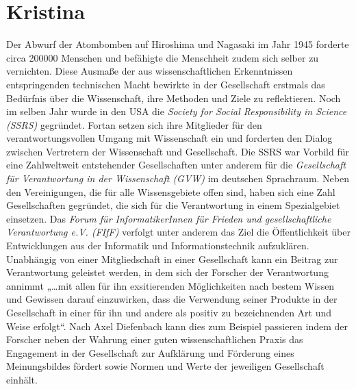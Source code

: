 \documentclass{pmwk}
\begin{document}
\section*{Kristina}
Der Abwurf der Atombomben auf Hiroshima und Nagasaki im Jahr 1945 forderte circa 200000 Menschen und befähigte die Menschheit zudem sich selber zu vernichten. Diese Ausmaße der aus wissenschaftlichen Erkenntnissen entspringenden technischen Macht bewirkte in der Gesellschaft erstmals das Bedürfnis über die Wissenschaft, ihre Methoden und Ziele zu reflektieren. Noch im selben Jahr wurde in den USA die \textit{Society for Social Responsibility in Science (SSRS)} gegründet. Fortan setzen sich ihre Mitglieder für den verantwortungsvollen Umgang mit Wissenschaft ein und forderten den Dialog zwischen Vertretern der Wissenschaft und Gesellschaft. Die SSRS war Vorbild für eine Zahlweltweit entstehender Gesellschaften unter anderem für die \textit{Gesellschaft für Verantwortung in der Wissenschaft (GVW)} im deutschen Sprachraum. Neben den Vereinigungen, die für alle Wissensgebiete offen sind, haben sich eine Zahl Gesellschaften gegründet, die sich für die Verantwortung in einem Spezialgebiet einsetzen. Das \textit{Forum für InformatikerInnen für Frieden und gesellschaftliche Verantwortung e.V. (FIfF)} verfolgt unter anderem das Ziel die Öffentlichkeit über Entwicklungen aus der Informatik und Informationstechnik aufzuklären.
Unabhängig von einer Mitgliedschaft in einer Gesellschaft kann ein Beitrag zur Verantwortung geleistet werden, in dem sich der Forscher der Verantwortung annimmt „…mit allen für ihn exsitierenden Möglichkeiten nach bestem Wissen und Gewissen darauf einzuwirken, dass die Verwendung seiner Produkte in der Gesellschaft in einer für ihn und andere als positiv zu bezeichnenden Art und Weise erfolgt“. Nach Axel Diefenbach kann dies zum Beispiel passieren indem der Forscher neben der Wahrung einer guten wissenschaftlichen Praxis das Engagement in der Gesellschaft zur Aufklärung und Förderung eines Meinungsbildes fördert sowie Normen und Werte der jeweiligen Gesellschaft einhält.
\end{document}
